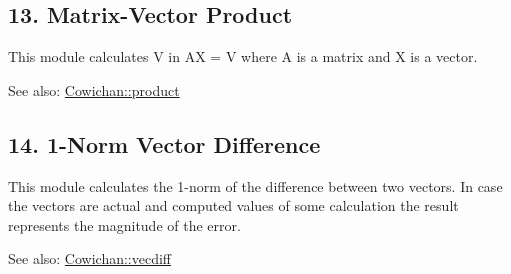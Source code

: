 \hypertarget{index_product_sec}{}\subsection{13. Matrix-Vector Product}\label{index_product_sec}
This module calculates V in AX = V where A is a matrix and X is a vector. \begin{Desc}
\item[See also:]\hyperlink{class_cowichan_3d7d4b581a1d6f0392dc452830fb3b03}{Cowichan::product}\end{Desc}
\hypertarget{index_vecdiff_sec}{}\subsection{14. 1-Norm Vector Difference}\label{index_vecdiff_sec}
This module calculates the 1-norm of the difference between two vectors. In case the vectors are actual and computed values of some calculation the result represents the magnitude of the error. \begin{Desc}
\item[See also:]\hyperlink{class_cowichan_775d72b5e7d122f9f32555352278250e}{Cowichan::vecdiff} \end{Desc}
